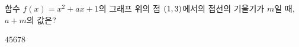함수 $f(x)=x^2+ax+1$의 그래프 위의 점 $(1{,}\mkern3mu\mathopen{}3)$에서의 접선의 기울기가 $m$일 때, $a+m$의 값은? 
\begin{choices32}{$4$}{$5$}{$6$}{$7$}{$8$}\end{choices32}

